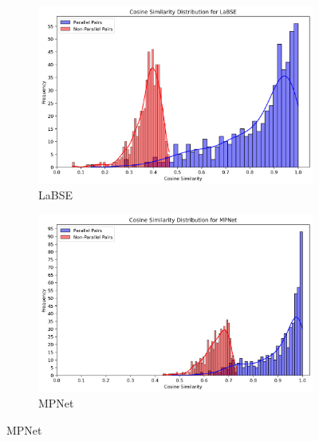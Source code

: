 \documentclass[12pt]{article}
\begin{document}
\begin{figure}[htbp]
\vspace{1em}

\begin{subfigure}{0.45\textwidth}
    \centering
    \includegraphics[width=\linewidth]{nonpar_par_histogram_LaBSE.png}
    \caption{LaBSE}
    \label{fig:labse_dist}
\end{subfigure}
\hfill
\begin{subfigure}{0.45\textwidth}
    \centering
    \includegraphics[width=\linewidth]{nonpar_par_histogram_MPNet.png}
    \caption{MPNet}
    \label{fig:mpnet_dist}
\end{subfigure}

\vspace{1em}
\end{figure}
\end{document}
